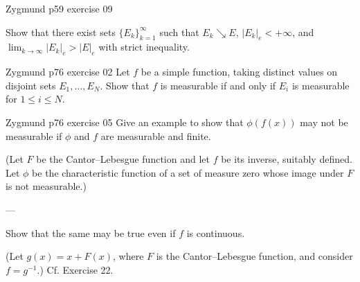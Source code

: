 \documentclass[UTF8,a4paper,10pt]{article}
\begin{document}
  \begin{Problem}[]{Zygmund p59 exercise 09}

    Show that there exist sets \(\{E_k\}_{k=1}^{\infty}\) such that \(E_k \searrow  E\), \(|E_k|_e < +\infty\), and \(\lim_{k\to\infty} |E_k|_e > |E|_e\) with strict inequality.
  \end{Problem}

  \begin{Problem}[]{Zygmund p76 exercise 02}
  Let \(f\) be a simple function, taking distinct values on disjoint sets \(E_1, \ldots, E_N\). Show that \(f\) is measurable if and only if \(E_i\) is measurable for \(1 \leq i \leq N\).

\end{Problem}


\begin{Problem}[]{Zygmund p76 exercise 05}
  Give an example to show that \(\phi(f(x))\) may not be measurable if \(\phi\) and \(f\) are measurable and finite.
  
  (Let \(F\) be the Cantor–Lebesgue function and let \(f\) be its inverse, suitably defined. Let \(\phi\) be the characteristic function of a set of measure zero whose image under \(F\) is not measurable.) 
  
  ---
  
  Show that the same may be true even if \(f\) is continuous. 
  
  (Let \(g(x) = x + F(x)\), where \(F\) is the Cantor–Lebesgue function, and consider \(f = g^{-1}\).) Cf. Exercise 22.

\end{Problem}
\end{document}
